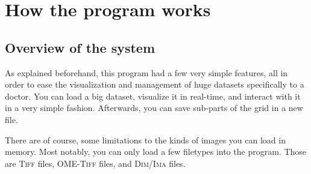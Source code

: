 \chapter{How the program works}

\begin{comment}
	What will be included in this section :
		- Very brief overview :
			- Open the program
			- Load a grid
			- Visualize it
			- Interact with it
			- Save it/close the program
		- Opening the program :
			- What gets created
			- What can you do right now ?
			- What does the code do in the background ?
		- Loading a grid :
			- What can you load ? (filetypes, types of data) -> for types of data, specify more info will be given in technical doc for the new grid api
			- what parameters can you specify ?
			- How to specify them ?
			- What does the code do in the background ?
		- Visualizing a grid :
			- What can you do ? (different viewing modes and how they work, quickly)
			- How do the things get drawn on screen ?
			- How do the different viewers get controlled ?
			- What does the code do in the background ?
		- Interacting with the grids on screen ?
			- What can you do ?
			- How does it work ?
			- What does the code do in the background ?
		- Generating/saving grids
			- What can you do with this ?
			- How does it work ?
			- What options/parameters can you set ?
			- What does the code do in the background ?
\end{comment}

\section{Overview of the system}
{

	As explained beforehand, this program had a few very simple features, all in order to ease the visualization and management of huge datasets specifically to a doctor. You can load a big dataset, visualize it in real-time, and interact with it in a very simple fashion. Afterwards, you can save sub-parts of the grid in a new file.

	There are of course, some limitations to the kinds of images you can load in memory. Most notably, you can only load a few filetypes into the program. Those are \textsc{Tiff} files, \textsc{OME-Tiff} files, and \textsc{Dim/Ima} files.
}
